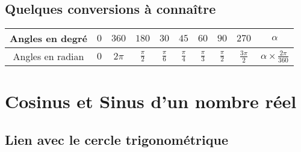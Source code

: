 \documentclass[10pt,openright,twoside,french]{book}
\begin{document}
\subsection{Quelques conversions à connaître}

\begin{center}
\renewcommand\arraystretch{2.5}
    \begin{tabular}{*{10}{|c}|}
        \hline
            Angles en degré & $0$ & $360$ & $180$ & $30$ & $45$ & $60$ & $90$ & $270$ & $\alpha$ \\
        \hline
            Angles en radian & $0$ & $2\pi$ & $\frac\pi2$ & $\frac{\pi}{6}$ & $\frac\pi4$ & $\frac\pi3$ & $\frac\pi2$ & $\frac{3\pi}{2}$  & $\alpha \times\frac{2\pi}{360}$\\
        \hline
    \end{tabular}
\end{center}

\section{Cosinus et Sinus d'un nombre réel}
\subsection{Lien avec le cercle trigonométrique}
\end{document}
